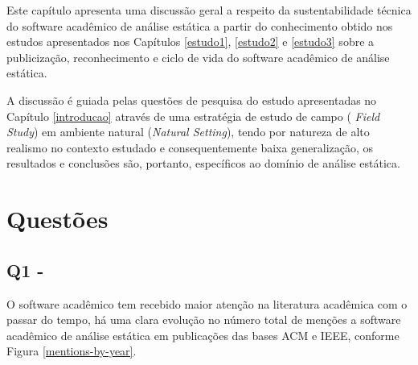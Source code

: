\label{discussao}


Este capítulo apresenta uma discussão geral a respeito da sustentabilidade
técnica do software acadêmico de análise estática a partir do conhecimento
obtido nos estudos apresentados nos Capítulos \ref{estudo1}, \ref{estudo2} e
\ref{estudo3} sobre a publicização, reconhecimento e ciclo de vida do software
acadêmico de análise estática.

A discussão é guiada pelas questões de pesquisa do estudo apresentadas no
Capítulo \ref{introducao} através de uma estratégia de estudo de campo ({\it
Field Study}) em ambiente natural ({\it Natural Setting}), tendo por natureza
de alto realismo no contexto estudado e consequentemente baixa generalização, os
resultados e conclusões são, portanto, específicos ao domínio de análise
estática.

\section{Questões} 

\subsection{Q1 - \QuestaoUm} %

O software acadêmico tem recebido maior atenção na literatura acadêmica com o
passar do tempo, há uma clara evolução no número total de menções a software
acadêmico de análise estática em publicações das bases ACM e IEEE, conforme
Figura \ref{mentions-by-year}.

